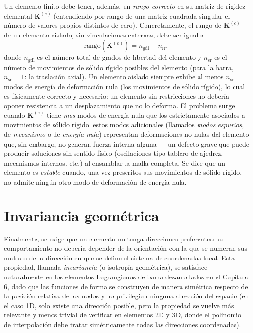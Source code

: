 Un elemento finito debe tener, además, un \emph{rango correcto} en su matriz de rigidez elemental $\bm K^{(e)}$ (entendiendo por rango de una matriz cuadrada singular el número de valores propios distintos de cero). Concretamente, el rango de $\bm K^{(e)}$ de un elemento aislado, sin vinculaciones externas, debe ser igual a
\[
\text{rango}(\bm K^{(e)}) = n_{\text{gdl}} - n_{\text{sr}} ,
\]
donde $n_{\text{gdl}}$ es el número total de grados de libertad del elemento y $n_{\text{sr}}$ es el número de movimientos de sólido rígido posibles del elemento (para la barra, $n_{\text{sr}}=1$: la traslación axial). Un elemento aislado siempre exhibe al menos $n_{\text{sr}}$ modos de energía de deformación nula (los movimientos de sólido rígido), lo cual es físicamente correcto y necesario: un elemento sin restricciones no debería oponer resistencia a un desplazamiento que no lo deforma. El problema surge cuando $\bm K^{(e)}$ tiene \emph{más} modos de energía nula que los estrictamente asociados a movimientos de sólido rígido: estos modos adicionales (llamados \emph{modos espurios}, de \emph{mecanismo} o de \emph{energía nula}) representan deformaciones no nulas del elemento que, sin embargo, no generan fuerza interna alguna --- un defecto grave que puede producir soluciones sin sentido físico (oscilaciones tipo tablero de ajedrez, mecanismos internos, etc.) al ensamblar la malla completa. Se dice que un elemento es \emph{estable} cuando, una vez prescritos sus movimientos de sólido rígido, no admite ningún otro modo de deformación de energía nula.

\section{Invariancia geométrica}

Finalmente, se exige que un elemento no tenga direcciones preferentes: su comportamiento no debería depender de la orientación con la que se numeran sus nodos o de la dirección en que se define el sistema de coordenadas local. Esta propiedad, llamada \emph{invariancia} (o isotropía geométrica), se satisface naturalmente en los elementos Lagrangianos de barra desarrollados en el Capítulo 6, dado que las funciones de forma se construyen de manera simétrica respecto de la posición relativa de los nodos y no privilegian ninguna dirección del espacio (en el caso 1D, solo existe una dirección posible, pero la propiedad se vuelve más relevante y menos trivial de verificar en elementos 2D y 3D, donde el polinomio de interpolación debe tratar simétricamente todas las direcciones coordenadas).

